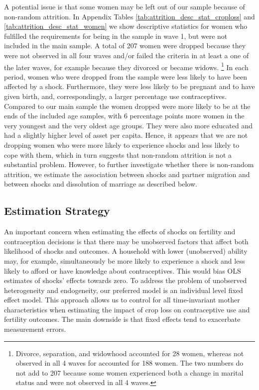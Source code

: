 \documentclass[letterpaper,12pt]{article}
\begin{document}
A potential issue is that some women may be left out of our sample because of
non-random attrition.
In Appendix Tables \ref{tab:attrition_desc_stat_croploss} and \ref{tab:attrition_desc_stat_women}
we show descriptive statistics for women who fulfilled the requirements for being in the 
sample in wave 1, but were not included in the main sample.
A total of 207 women were dropped because they were not observed in all four waves 
and/or failed the criteria in at least a one of the later waves, for example 
because they divorced or became widows.%
\footnote{
Divorce, separation, and widowhood accounted for 28 women, whereas not observed in all
4 waves for accounted for 188 women. 
The two numbers do not add to 207 because some women experienced both a change
in marital status and were not observed in all 4 waves.
}
In each period, women who were dropped from the sample were less likely to have been 
affected by a shock.
Furthermore, they were less likely to be pregnant and to have given birth, and,
correspondingly, a larger percentage use contraceptives.
Compared to our main sample the women dropped were more likely to be at the ends of
the included age samples, with 6 percentage points more women in the very youngest
and the very oldest age groups.
They were also more educated and had a slightly higher level of asset per capita.
Hence, it appears that we are not dropping women who were more likely to 
experience shocks and less likely to cope with them, which in turn suggests that 
non-random attrition is not a substantial problem.
However, to further investigate whether there is non-random attrition, we 
estimate the association between shocks and partner migration and between
shocks and dissolution of marriage as described below.



\subsection{Estimation Strategy}

An important concern when estimating
the effects of shocks on fertility and contraception decisions 
is that there may be unobserved factors that affect both likelihood of 
shocks and outcomes.
A household with lower (unobserved) ability may, for example, simultaneously be more 
likely to experience a shock and less likely to afford or have knowledge about 
contraceptives.
This would bias OLS estimates of shocks' effects towards zero.
To address the problem of unobserved heterogeneity and endogeneity, our
preferred model is an individual level fixed effect model. 
This approach allows us to control for all time-invariant mother characteristics when 
estimating the impact of crop loss on contraceptive use and fertility outcomes.
The main downside is that fixed effects tend to exacerbate measurement errors.
\end{document}
